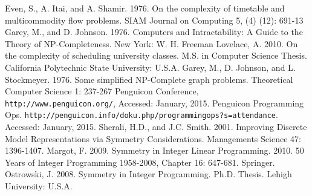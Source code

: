 \documentclass{svjour3}                     %
\begin{document}
\begin{thebibliography}{9}
	Even, S., A. Itai, and A. Shamir. 1976. On the complexity of timetable and multicommodity flow problems. SIAM Journal on Computing 5, (4) (12): 691-13
	Garey, M., and D. Johnson. 1976. Computers and Intractability: A Guide to the Theory of NP-Completeness. New York: W. H. Freeman
	Lovelace, A. 2010. On the complexity of scheduling university classes. M.S. in Computer Science Thesis. California Polytechnic State University: U.S.A.	
	Garey, M., D. Johnson, and L. Stockmeyer. 1976. Some simplified NP-Complete graph problems. Theoretical Computer Science 1: 237-267
	Penguicon Conference, \texttt{http://www.penguicon.org/}, Accessed: January, 2015.
	Penguicon Programming Ops. \texttt{http://penguicon.info/doku.php/programmingops?s=attendance}.  Accessed: January, 2015. %
	Sherali, H.D., and J.C. Smith. 2001. Improving Discrete Model Representations via Symmetry Considerations. Managements Science 47: 1396-1407.
	Margot, F. 2009. Symmetry in Integer Linear Programming. 2010. 50 Years of Integer Programming 1958-2008, Chapter 16: 647-681. Springer.
	Ostrowski, J. 2008. Symmetry in Integer Programming. Ph.D. Thesis. Lehigh University: U.S.A. 
\end{thebibliography}
	
\end{document}
